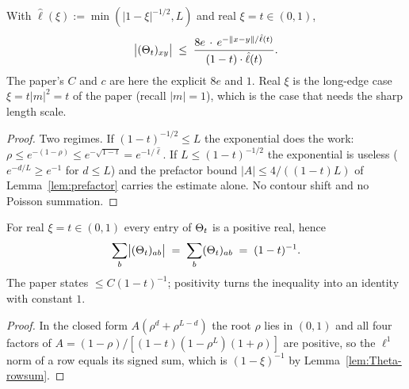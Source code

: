 \begin{lemma}\label{lem:Theta-decay}
  \leanok{}
  With $\hat\ell(\xi):=\min(|1-\xi|^{-1/2},L)$ and real $\xi = t \in (0,1)$,
  \[ \bigl|(\Theta_t)_{xy}\bigr| \;\le\;
     \frac{8e\,\cdot\,e^{-\|x-y\|/\hat\ell(t)}}{(1-t)\cdot\hat\ell(t)} . \]
  The paper's $C$ and $c$ are here the explicit $8e$ and $1$.  Real $\xi$ is the
  long-edge case $\xi = t|m|^2 = t$ of the paper (recall $|m| = 1$), which is the
  case that needs the sharp length scale.
\end{lemma}
\begin{proof}\leanok{}
  Two regimes.  If $(1-t)^{-1/2}\le L$ the exponential does the work:
  $\rho \le e^{-(1-\rho)} \le e^{-\sqrt{1-t}} = e^{-1/\hat\ell}$.  If $L \le (1-t)^{-1/2}$
  the exponential is useless ($e^{-d/L}\ge e^{-1}$ for $d \le L$) and the prefactor
  bound $|A| \le 4/((1-t)L)$ of Lemma~\ref{lem:prefactor} carries the estimate alone.
  No contour shift and no Poisson summation.
\end{proof}

\begin{lemma}\label{lem:Theta-l1}
  \leanok{}
  For real $\xi = t \in (0,1)$ every entry of $\Theta_t$ is a positive real, hence
  \[ \sum_b \bigl|(\Theta_t)_{ab}\bigr| \;=\; \sum_b (\Theta_t)_{ab} \;=\; (1-t)^{-1} . \]
  The paper states $\le C(1-t)^{-1}$; positivity turns the inequality into an identity
  with constant $1$.
\end{lemma}
\begin{proof}\leanok{}
  In the closed form $A(\rho^d+\rho^{L-d})$ the root $\rho$ lies in $(0,1)$ and all four
  factors of $A = (1-\rho)/[(1-t)(1-\rho^L)(1+\rho)]$ are positive, so the $\ell^1$ norm of
  a row equals its signed sum, which is $(1-\xi)^{-1}$ by Lemma~\ref{lem:Theta-rowsum}.
\end{proof}

